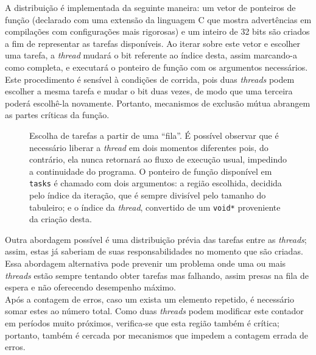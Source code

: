 \documentclass[12pt]{sftex/sftex}
\begin{document}
A distribuição é implementada da seguinte maneira: um vetor de ponteiros de
função (declarado com uma extensão da linguagem C que mostra advertências em
compilações com configurações mais rigorosas) e um inteiro de 32 bits são
criados a fim de representar as tarefas disponíveis. Ao iterar sobre este vetor
e escolher uma tarefa, a \emph{thread} mudará o bit referente ao índice desta,
assim marcando-a como completa, e executará o ponteiro de função com os
argumentos necessários.  Este procedimento é sensível à condições de corrida,
pois duas \emph{threads} podem escolher a mesma tarefa e mudar o bit duas
vezes, de modo que uma terceira poderá escolhê-la novamente. Portanto,
mecanismos de exclusão mútua abrangem as partes críticas da função.

\begin{figure}[htbp]
  
  \caption{Escolha de tarefas a partir de uma ``fila''. É possível observar
    que é necessário liberar a \emph{thread} em dois momentos diferentes
    pois, do contrário, ela nunca retornará ao fluxo de execução usual,
    impedindo a continuidade do programa. O ponteiro de função disponível em
    \texttt{tasks} é chamado com dois argumentos: a região escolhida, decidida
    pelo índice da iteração, que é sempre divisível pelo tamanho do tabuleiro;
    e o índice da \emph{thread}, convertido de um \texttt{void*} proveniente
    da criação desta.}
\end{figure}

Outra abordagem possível é uma distribuição prévia das tarefas entre as
\emph{threads}; assim, estas já saberiam de suas responsabilidades no momento
que são criadas.  Essa abordagem alternativa pode prevenir um problema onde uma
ou mais \emph{threads} estão sempre tentando obter tarefas mas falhando, assim
presas na fila de espera e não oferecendo desempenho máximo. \\

Após a contagem de erros, caso um exista um elemento repetido, é necessário
somar estes ao número total. Como duas \emph{threads} podem modificar este
contador em períodos muito próximos, verifica-se que esta região também é
crítica; portanto, também é cercada por mecanismos que impedem a contagem
errada de erros.



\end{document}
